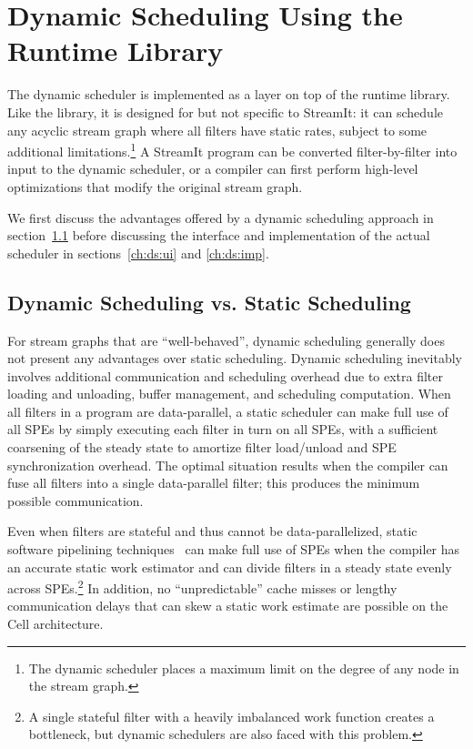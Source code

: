 \chapter{Dynamic Scheduling Using the Runtime Library}\label{ch:ds}

The dynamic scheduler is implemented as a layer on top of the runtime library. Like the library, it is designed for but not specific to StreamIt: it can schedule any acyclic stream graph where all filters have static rates, subject to some additional limitations.\footnote{The dynamic scheduler places a maximum limit on the degree of any node in the stream graph.} A StreamIt program can be converted filter-by-filter into input to the dynamic scheduler, or a compiler can first perform high-level optimizations that modify the original stream graph.

We first discuss the advantages offered by a dynamic scheduling approach in section~\ref{ch:ds:bg} before discussing the interface and implementation of the actual scheduler in sections~\ref{ch:ds:ui} and \ref{ch:ds:imp}.

\section{Dynamic Scheduling vs. Static Scheduling}\label{ch:ds:bg}

For stream graphs that are ``well-behaved'', dynamic scheduling generally does not present any advantages over static scheduling. Dynamic scheduling inevitably involves additional communication and scheduling overhead due to extra filter loading and unloading, buffer management, and scheduling computation. When all filters in a program are data-parallel, a static scheduler can make full use of all SPEs by simply executing each filter in turn on all SPEs, with a sufficient coarsening of the steady state to amortize filter load/unload and SPE synchronization overhead. The optimal situation results when the compiler can fuse all filters into a single data-parallel filter; this produces the minimum possible communication.

Even when filters are stateful and thus cannot be data-parallelized, static software pipelining techniques~\cite{asplos06} can make full use of SPEs when the compiler has an accurate static work estimator and can divide filters in a steady state evenly across SPEs.\footnote{A single stateful filter with a heavily imbalanced work function creates a bottleneck, but dynamic schedulers are also faced with this problem.} In addition, no ``unpredictable'' cache misses or lengthy communication delays that can skew a static work estimate are possible on the Cell architecture.

